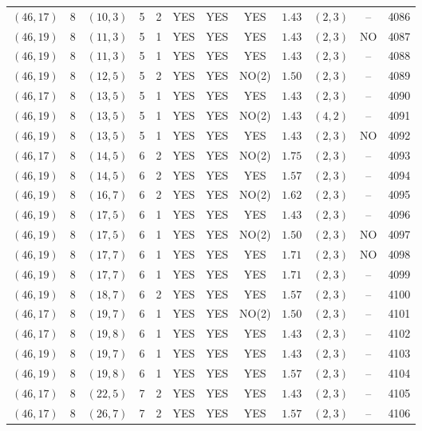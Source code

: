 \begin{longtable}{|c|c|c|c|c|c|c|c|c|c|c|c|}
$(46,17)$ & 8 & $(10,3)$ & 5 & 2 & YES & YES & YES & $1.43$ & $(2,3)$ & -- & 4086\\
$(46,19)$ & 8 & $(11,3)$ & 5 & 1 & YES & YES & YES & $1.43$ & $(2,3)$ & NO & 4087\\
$(46,19)$ & 8 & $(11,3)$ & 5 & 1 & YES & YES & YES & $1.43$ & $(2,3)$ & -- & 4088\\
$(46,19)$ & 8 & $(12,5)$ & 5 & 2 & YES & YES & NO(2) & $1.50$ & $(2,3)$ & -- & 4089\\
$(46,17)$ & 8 & $(13,5)$ & 5 & 1 & YES & YES & YES & $1.43$ & $(2,3)$ & -- & 4090\\
$(46,19)$ & 8 & $(13,5)$ & 5 & 1 & YES & YES & NO(2) & $1.43$ & $(4,2)$ & -- & 4091\\
$(46,19)$ & 8 & $(13,5)$ & 5 & 1 & YES & YES & YES & $1.43$ & $(2,3)$ & NO & 4092\\
$(46,17)$ & 8 & $(14,5)$ & 6 & 2 & YES & YES & NO(2) & $1.75$ & $(2,3)$ & -- & 4093\\
$(46,19)$ & 8 & $(14,5)$ & 6 & 2 & YES & YES & YES & $1.57$ & $(2,3)$ & -- & 4094\\
$(46,19)$ & 8 & $(16,7)$ & 6 & 2 & YES & YES & NO(2) & $1.62$ & $(2,3)$ & -- & 4095\\
$(46,19)$ & 8 & $(17,5)$ & 6 & 1 & YES & YES & YES & $1.43$ & $(2,3)$ & -- & 4096\\
$(46,19)$ & 8 & $(17,5)$ & 6 & 1 & YES & YES & NO(2) & $1.50$ & $(2,3)$ & NO & 4097\\
$(46,19)$ & 8 & $(17,7)$ & 6 & 1 & YES & YES & YES & $1.71$ & $(2,3)$ & NO & 4098\\
$(46,19)$ & 8 & $(17,7)$ & 6 & 1 & YES & YES & YES & $1.71$ & $(2,3)$ & -- & 4099\\
$(46,19)$ & 8 & $(18,7)$ & 6 & 2 & YES & YES & YES & $1.57$ & $(2,3)$ & -- & 4100\\
$(46,17)$ & 8 & $(19,7)$ & 6 & 1 & YES & YES & NO(2) & $1.50$ & $(2,3)$ & -- & 4101\\
$(46,17)$ & 8 & $(19,8)$ & 6 & 1 & YES & YES & YES & $1.43$ & $(2,3)$ & -- & 4102\\
$(46,19)$ & 8 & $(19,7)$ & 6 & 1 & YES & YES & YES & $1.43$ & $(2,3)$ & -- & 4103\\
$(46,19)$ & 8 & $(19,8)$ & 6 & 1 & YES & YES & YES & $1.57$ & $(2,3)$ & -- & 4104\\
$(46,17)$ & 8 & $(22,5)$ & 7 & 2 & YES & YES & YES & $1.43$ & $(2,3)$ & -- & 4105\\
$(46,17)$ & 8 & $(26,7)$ & 7 & 2 & YES & YES & YES & $1.57$ & $(2,3)$ & -- & 4106\\

\end{longtable}
